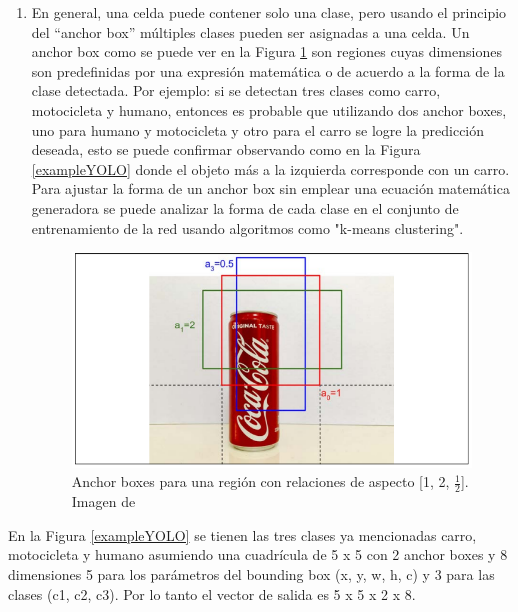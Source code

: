 \begin{enumerate}
    \item En general, una celda puede contener solo una clase, pero usando el principio del ``anchor box'' múltiples clases pueden ser asignadas a una celda. Un anchor box como se puede ver en la Figura \ref{anchor_boxes} son regiones cuyas dimensiones son predefinidas por una expresión matemática o de acuerdo a la forma de la clase detectada. Por ejemplo: si se detectan tres clases como carro, motocicleta y humano, entonces es probable que utilizando dos anchor boxes, uno para humano y motocicleta y otro para el carro se logre la predicción deseada, esto se puede confirmar observando como en la Figura \ref{exampleYOLO} donde el objeto más a la izquierda corresponde con un carro. Para ajustar la forma de un anchor box sin emplear una ecuación matemática generadora se puede analizar la forma de cada clase en el conjunto de entrenamiento de la red usando algoritmos como "k-means clustering".
    \begin{figure}[H]
        \centering
        \includegraphics[scale=0.7]{Recursos/anchor_boxes.png}
        \caption{Anchor boxes para una región con relaciones de aspecto [1, 2, $\frac{1}{2}$]. Imagen de \cite[p.~376]{Atienza2018}}
        \label{anchor_boxes}
    \end{figure}
\end{enumerate}
En la Figura \ref{exampleYOLO} se tienen las tres clases ya mencionadas carro, motocicleta y humano asumiendo una cuadrícula de 5 x 5 con 2 anchor boxes y 8 dimensiones 5 para los parámetros del bounding box (x, y, w, h, c) y 3 para las clases (c1, c2, c3). Por lo tanto el vector de salida es 5 x 5 x 2 x 8.
